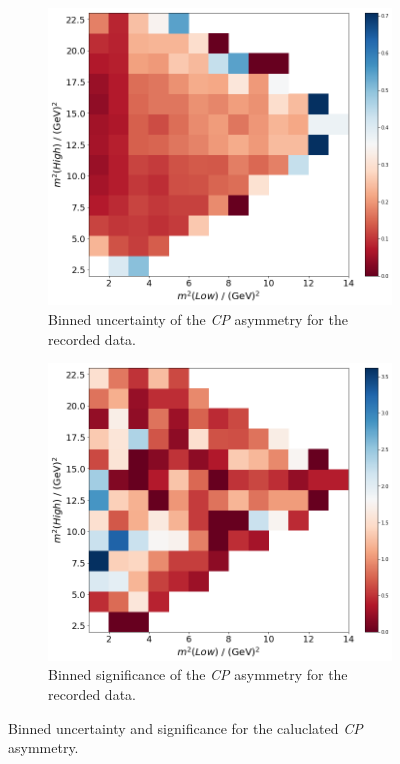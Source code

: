 \begin{figure}
  \centering
  \begin{subfigure}[b]{0.45\textwidth}
      \centering
      \includegraphics[width=\textwidth]{"content/pics/binned_unc_no_charm.png"}
      \caption{Binned uncertainty of the \textit{CP} asymmetry for the recorded data.}
  \end{subfigure}
  \hfill
  \begin{subfigure}[b]{0.45\textwidth}
      \centering
      \includegraphics[width=\textwidth]{"content/pics/binned_sig_no_charm.png"}
      \caption{Binned significance of the \textit{CP} asymmetry for the recorded data.}
  \end{subfigure}
     \caption{Binned uncertainty and significance for the caluclated \textit{CP} asymmetry.}
     \label{fig:binned_unc_sig_no_charm}
\end{figure}

